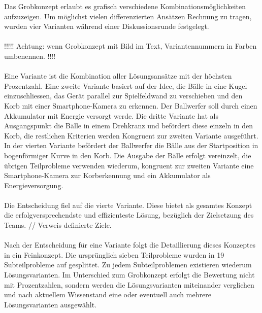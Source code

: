 Das Grobkonzept erlaubt es grafisch verschiedene Kombinationsmöglichkeiten aufzuzeigen. Um möglichst vielen differenzierten Ansätzen Rechnung zu tragen, wurden vier Varianten während einer Diskussionsrunde festgelegt.\\\\ 
!!!!! Achtung: wenn Grobkonzept mit Bild im Text, Variantennummern in Farben umbenennen. !!!!\\\\
Eine Variante ist die Kombination aller Lösungsansätze mit der höchsten Prozentzahl. Eine zweite Variante basiert auf der Idee, die Bälle in eine Kugel einzuschliessen, das Gerät parallel zur Spielfeldwand zu verschieben und den Korb mit einer Smartphone-Kamera zu erkennen. Der Ballwerfer soll durch einen Akkumulator mit Energie versorgt werde. Die dritte Variante hat als Ausgangspunkt die Bälle in einem Drehkranz und befördert diese einzeln in den Korb, die restlichen Kriterien werden Kongruent zur zweiten Variante ausgeführt. In der vierten Variante befördert der Ballwerfer die Bälle aus der Startposition in bogenförmiger Kurve in den Korb. Die Ausgabe der Bälle erfolgt vereinzelt, die übrigen Teilprobleme verwenden wiederum, kongruent zur zweiten Variante eine Smartphone-Kamera zur Korberkennung und ein Akkumulator als Energieversorgung.\\
\\
Die Entscheidung fiel auf die vierte Variante. Diese bietet als gesamtes Konzept die erfolgversprechendste und effizienteste Lösung, bezüglich der Zielsetzung des Teams. // Verweis definierte Ziele.\\
\\
Nach der Entscheidung für eine Variante folgt die Detaillierung dieses Konzeptes
in ein Feinkonzept. Die ursprünglich sieben Teilprobleme wurden in 19 Subteilprobleme
auf gesplittet. Zu jedem Subteilproblemen existieren wiederum Lösungsvarianten. Im Unterschied zum Grobkonzept erfolgt die Bewertung nicht mit Prozentzahlen, sondern werden die Lösungsvarianten miteinander verglichen und nach aktuellem Wissenstand eine oder eventuell auch mehrere Lösungsvarianten ausgewählt. 


